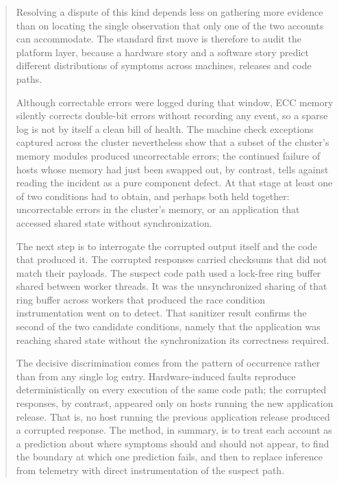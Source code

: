 \begin{quote}\small
Resolving a dispute of this kind depends less on gathering more evidence than on locating the single observation that only one of the two accounts can accommodate. The standard first move is therefore to audit the platform layer, because a hardware story and a software story predict different distributions of symptoms across machines, releases and code paths. 

 Although correctable errors were logged during that window, ECC memory silently corrects double-bit errors without recording any event, so a sparse log is not by itself a clean bill of health. The machine check exceptions captured across the cluster nevertheless show that a subset of the cluster's memory modules produced uncorrectable errors; the continued failure of hosts whose memory had just been swapped out, by contrast, tells against reading the incident as a pure component defect. At that stage at least one of two conditions had to obtain, and perhaps both held together: uncorrectable errors in the cluster's memory, or an application that accessed shared state without synchronization.

The next step is to interrogate the corrupted output itself and the code that produced it. The corrupted responses carried checksums that did not match their payloads. The suspect code path used a lock-free ring buffer shared between worker threads. It was the unsynchronized sharing of that ring buffer across workers that produced the race condition instrumentation went on to detect.  That sanitizer result confirms the second of the two candidate conditions, namely that the application was reaching shared state without the synchronization its correctness required.

The decisive discrimination comes from the pattern of occurrence rather than from any single log entry. Hardware-induced faults reproduce deterministically on every execution of the same code path; the corrupted responses, by contrast, appeared only on hosts running the new application release. That is, no host running the previous application release produced a corrupted response. The method, in summary, is to treat each account as a prediction about where symptoms should and should not appear, to find the boundary at which one prediction fails, and then to replace inference from telemetry with direct instrumentation of the suspect path.
\end{quote}

